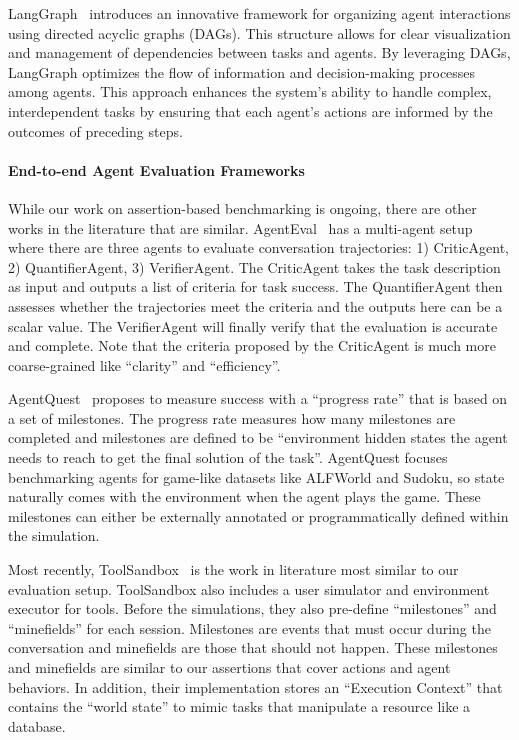 LangGraph~\cite{langgraph} introduces an innovative framework for organizing agent interactions using directed acyclic graphs (DAGs). This structure allows for clear visualization and management of dependencies between tasks and agents. By leveraging DAGs, LangGraph optimizes the flow of information and decision-making processes among agents. This approach enhances the system’s ability to handle complex, interdependent tasks by ensuring that each agent’s actions are informed by the outcomes of preceding steps. 


\paragraph{End-to-end Agent Evaluation Frameworks}

While our work on assertion-based benchmarking is ongoing, there are other works in the literature that are similar. AgentEval~\cite{arabzadeh-etal-2024-assessing} has a multi-agent setup where there are three agents to evaluate conversation trajectories: 1) CriticAgent, 2) QuantifierAgent, 3) VerifierAgent. The CriticAgent takes the task description as input and outputs a list of criteria for task success. The QuantifierAgent then assesses whether the trajectories meet the criteria and the outputs here can be a scalar value. The VerifierAgent will finally verify that the evaluation is accurate and complete. Note that the criteria proposed by the CriticAgent is much more coarse-grained like “clarity” and “efficiency”.

AgentQuest~\cite{gioacchini-etal-2024-agentquest} proposes to measure success with a “progress rate” that is based on a set of milestones. The progress rate measures how many milestones are completed and milestones are defined to be “environment hidden states the agent needs to reach to get the final solution of the task”. AgentQuest focuses benchmarking agents for game-like datasets like ALFWorld and Sudoku, so state naturally comes with the environment when the agent plays the game. These milestones can either be externally annotated or programmatically defined within the simulation.

Most recently, ToolSandbox~\cite{lu2024toolsandbox} is the work in literature most similar to our evaluation setup. ToolSandbox also includes a user simulator and environment executor for tools. Before the simulations, they also pre-define “milestones” and “minefields” for each session. Milestones are events that must occur during the conversation and minefields are those that should not happen. These milestones and minefields are similar to our assertions that cover actions and agent behaviors. In addition, their implementation stores an “Execution Context” that contains the “world state” to mimic tasks that manipulate a resource like a database.
